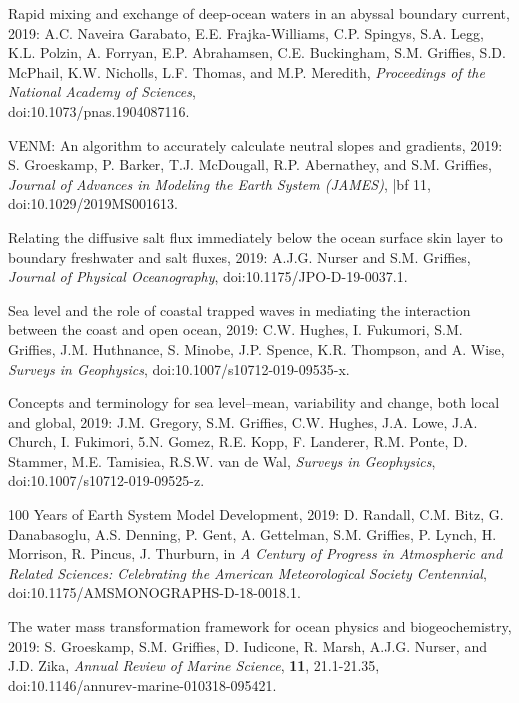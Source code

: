 \begin{etaremune}
\item Rapid mixing and exchange of deep-ocean waters in an abyssal boundary current, 2019: A.C. Naveira Garabato, E.E. Frajka-Williams, C.P. Spingys, S.A. Legg, K.L. Polzin, A. Forryan, E.P. Abrahamsen, C.E. Buckingham, S.M. Grif\/f\/ies, S.D. McPhail, K.W. Nicholls, L.F. Thomas, and M.P. Meredith,  {\it Proceedings of the National Academy of Sciences}, \\ doi:10.1073/pnas.1904087116.

\item VENM: An algorithm to accurately calculate neutral slopes and gradients, 2019: S. Groeskamp, P. Barker, T.J. McDougall, R.P. Abernathey, and S.M. Grif\/f\/ies, {\it Journal of Advances in Modeling the Earth System (JAMES)}, {|bf 11}, doi:10.1029/2019MS001613.

\item Relating the diffusive salt flux immediately below the ocean surface skin layer to boundary freshwater and salt fluxes, 2019: A.J.G. Nurser and S.M. Grif\/f\/ies, {\it Journal of Physical Oceanography}, doi:10.1175/JPO-D-19-0037.1.

\item Sea level and the role of coastal trapped waves in mediating the interaction between the coast and open ocean, 2019: C.W. Hughes, I. Fukumori, S.M. Grif\/f\/ies, J.M. Huthnance, S. Minobe, J.P. Spence, K.R. Thompson, and A. Wise, {\it Surveys in Geophysics}, 
doi:10.1007/s10712-019-09535-x.

\item Concepts and terminology for sea level--mean, variability and change, both local and global, 2019: J.M. Gregory, S.M. Grif\/f\/ies, C.W. Hughes, J.A. Lowe, J.A. Church, I. Fukimori, 5.N. Gomez, R.E. Kopp, F. Landerer, R.M. Ponte, D. Stammer, M.E. Tamisiea, R.S.W. van de Wal, {\it Surveys in Geophysics},
doi:10.1007/s10712-019-09525-z.

\item 100 Years of Earth System Model Development, 2019: D. Randall, C.M. Bitz, G. Danabasoglu, A.S. Denning, P. Gent, A. Gettelman, S.M. Grif\/f\/ies, P. Lynch, H. Morrison, R. Pincus, J. Thurburn, in {\it A Century of Progress in Atmospheric and Related Sciences: Celebrating the American Meteorological Society Centennial}, doi:10.1175/AMSMONOGRAPHS-D-18-0018.1.

\item The water mass transformation framework for ocean physics and biogeochemistry, 2019: S. Groeskamp, S.M. Grif\/f\/ies, D. Iudicone,  R. Marsh, A.J.G. Nurser, and J.D. Zika, {\it Annual Review of Marine Science}, {\bf 11}, 21.1-21.35,
doi:10.1146/annurev-marine-010318-095421.


\end{etaremune}
